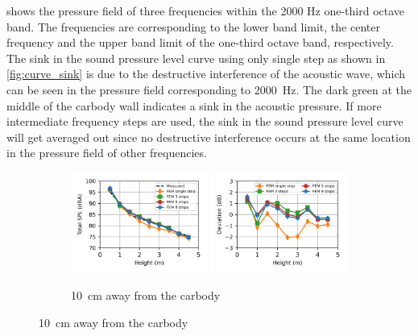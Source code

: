  shows the pressure field of three frequencies within the 2000 Hz one-third octave band. The frequencies are corresponding to the lower band limit, the center frequency and the upper band limit of the one-third octave band, respectively. The sink in the sound pressure level curve using only single step as shown in \cref{fig:curve_sink} is due to the destructive interference of the acoustic wave, which can be seen in the pressure field corresponding to \SI{2000}{\hertz}. The dark green at the middle of the carbody wall indicates a sink in the acoustic pressure. If more intermediate frequency steps are used, the sink in the sound pressure level curve will get averaged out since no destructive interference occurs at the same location in the pressure field of other frequencies.

\begin{figure}
	\begin{subfigure}[b]{\textwidth}
		\centering
		\includegraphics[width=0.49\textwidth]{fig/chap5/freq_steps/overall_SPL/pos_a.png}
		\includegraphics[width=0.49\textwidth]{fig/chap5/freq_steps/overall_SPL/pos_a_deviation.png}
		\caption{\SI{10}{\centi\meter} away from the carbody}
	\end{subfigure}


\end{figure}
